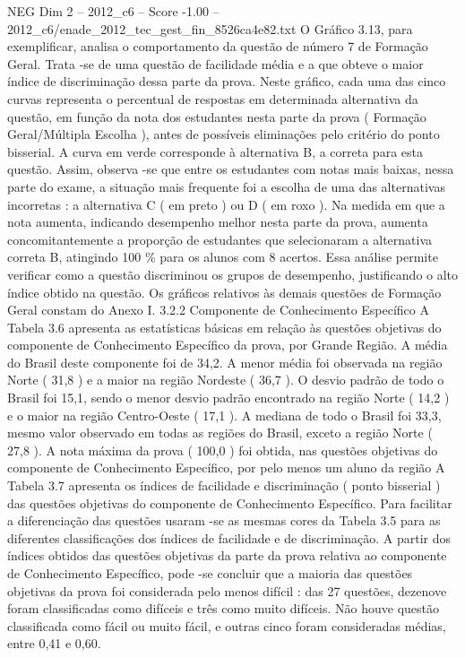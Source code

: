 \begin{textsample}{NEG Dim 2 – 2012\_c6 – Score -1.00 – 2012\_c6/enade\_2012\_tec\_gest\_fin\_8526ca4e82.txt}
O Gráfico 3.13, para exemplificar, analisa o comportamento da questão de número 7 de Formação Geral.
Trata -se de uma questão de facilidade média e a que obteve o maior índice de discriminação dessa parte da prova.
Neste gráfico, cada uma das cinco curvas representa o percentual de respostas em determinada alternativa da questão, em função da nota dos estudantes nesta parte da prova ( Formação Geral/Múltipla Escolha ), antes de possíveis eliminações pelo critério do ponto bisserial.
A curva em verde corresponde à alternativa B, a correta para esta questão.
Assim, observa -se que entre os estudantes com notas mais baixas, nessa parte do exame, a situação mais frequente foi a escolha de uma das alternativas incorretas : a alternativa C ( em preto ) ou D ( em roxo ).
Na medida em que a nota aumenta, indicando desempenho melhor nesta parte da prova, aumenta concomitantemente a proporção de estudantes que selecionaram a alternativa correta B, atingindo 100 \% para os alunos com 8 acertos.
Essa análise permite verificar como a questão discriminou os grupos de desempenho, justificando o alto índice obtido na questão.
Os gráficos relativos às demais questões de Formação Geral constam do Anexo I. 3.2.2 Componente de Conhecimento Específico A Tabela 3.6 apresenta as estatísticas básicas em relação às questões objetivas do componente de Conhecimento Específico da prova, por Grande Região.
A média do Brasil deste componente foi de 34,2.
A menor média foi observada na região Norte ( 31,8 ) e a maior na região Nordeste ( 36,7 ).
O desvio padrão de todo o Brasil foi 15,1, sendo o menor desvio padrão encontrado na região Norte ( 14,2 ) e o maior na região Centro-Oeste ( 17,1 ).
A mediana de todo o Brasil foi 33,3, mesmo valor observado em todas as regiões do Brasil, exceto a região Norte ( 27,8 ).
A nota máxima da prova ( 100,0 ) foi obtida, nas questões objetivas do componente de Conhecimento Específico, por pelo menos um aluno da região A Tabela 3.7 apresenta os índices de facilidade e discriminação ( ponto bisserial ) das questões objetivas do componente de Conhecimento Específico.
Para facilitar a diferenciação das questões usaram -se as mesmas cores da Tabela 3.5 para as diferentes classificações dos índices de facilidade e de discriminação.
A partir dos índices obtidos das questões objetivas da parte da prova relativa ao componente de Conhecimento Específico, pode -se concluir que a maioria das questões objetivas da prova foi considerada pelo menos difícil : das 27 questões, dezenove foram classificadas como difíceis e três como muito difíceis.
Não houve questão classificada como fácil ou muito fácil, e outras cinco foram consideradas médias, entre 0,41 e 0,60.

\end{textsample}
